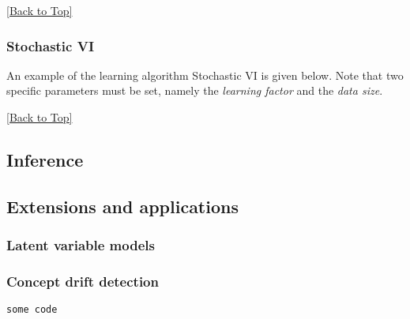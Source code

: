 \documentclass[10pt,a4paper]{article}
\newcommand{\includejavasource}[1]{}
\newcommand{\lang}[1]{}
\begin{document}
\includejavasource{../../../../examples/src/main/java/eu/amidst/flinklink/examples/learning/DistributedVIExample.java}

\hyperref[sec:flinklink]{[Back to Top]}\newline 

\subsubsection{Stochastic VI}\label{sec:flinklink:learning:svi}

An example of the learning algorithm Stochastic VI is given below. Note that two specific parameters must be set, namely the \textit{learning factor} and the \textit{data size}.

\includejavasource{../../../../examples/src/main/java/eu/amidst/flinklink/examples/learning/StochasticVIExample.java}

\hyperref[sec:flinklink]{[Back to Top]}\newline 


\subsection{Inference}
\subsection{Extensions and applications}
\subsubsection{Latent variable models}
\subsubsection{Concept drift detection}

\lang{java}
\begin{lstlisting}
some code  
\end{lstlisting}
\end{document}
